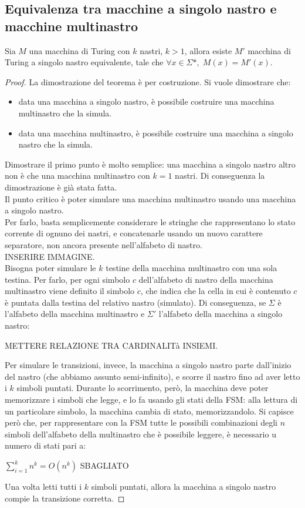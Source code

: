 \subsection*{Equivalenza tra macchine a singolo nastro e macchine multinastro}
\begin{thm}
    Sia $M$ una macchina di Turing con $k$ nastri, $k>1$, allora esiste $M'$ macchina di Turing a singolo nastro equivalente, tale che $\forall x \in \Sigma*, \; M(x) = M'(x)$.
\end{thm}

\begin{proof}
    La dimostrazione del teorema è per costruzione. Si vuole dimostrare che:
    \begin{itemize}
        \item data una macchina a singolo nastro, è possibile costruire una macchina multinastro che la simula.
        \item data una macchina multinastro, è possibile costruire una macchina a singolo nastro che la simula.
    \end{itemize}
    Dimostrare il primo punto è molto semplice: una macchina a singolo nastro altro non è che una macchina multinastro con $k = 1$ nastri. Di conseguenza la dimostrazione è già stata fatta.\\
    Il punto critico è poter simulare una macchina multinastro usando una macchina a singolo nastro.\\
    Per farlo, basta semplicemente considerare le stringhe che rappresentano lo stato corrente di ognuno dei nastri, e concatenarle usando un nuovo carattere separatore, non ancora presente nell'alfabeto di nastro.\\
        INSERIRE IMMAGINE.\\
    Bisogna poter simulare le $k$ testine della macchina multinastro con una sola testina. Per farlo, per ogni simbolo $c$ dell'alfabeto di nastro della macchina multinastro viene definito il simbolo $\dot{c}$, che indica che la cella in cui è contenuto $c$ è puntata dalla testina del relativo nastro (simulato).
    Di conseguenza, se $\Sigma$ è l'alfabeto della macchina multinastro e $\Sigma'$ l'alfabeto della macchina a singolo nastro:
    \begin{center}
        METTERE RELAZIONE TRA CARDINALITà INSIEMI.
    \end{center}
    Per simulare le transizioni, invece, la macchina a singolo nastro parte dall'inizio del nastro (che abbiamo assunto semi-infinito), e scorre il nastro fino ad aver letto i $k$ simboli puntati. Durante lo scorrimento, però, la macchina deve poter memorizzare i simboli che legge, e lo fa usando gli stati della FSM: alla lettura di un particolare simbolo, la macchina cambia di stato, memorizzandolo. Si capisce però che, per rappresentare con la FSM tutte le possibili combinazioni degli $n$ simboli dell'alfabeto della multinastro che è possibile leggere, è necessario u numero di stati pari a:
    \begin{center}
        $\sum_{i=1}^{k} n^k = O(n^k)$ SBAGLIATO
    \end{center}
    Una volta letti tutti i $k$ simboli puntati, allora la macchina a singolo nastro compie la transizione corretta.
\end{proof}

